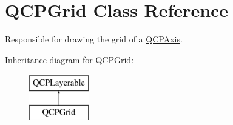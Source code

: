 \hypertarget{classQCPGrid}{\section{\-Q\-C\-P\-Grid \-Class \-Reference}
\label{classQCPGrid}
}


\-Responsible for drawing the grid of a \hyperlink{classQCPAxis}{\-Q\-C\-P\-Axis}.  


\-Inheritance diagram for \-Q\-C\-P\-Grid\-:\begin{figure}[H]
\begin{center}
\leavevmode
\includegraphics[height=2.000000cm]{classQCPGrid}
\end{center}
\end{figure}
